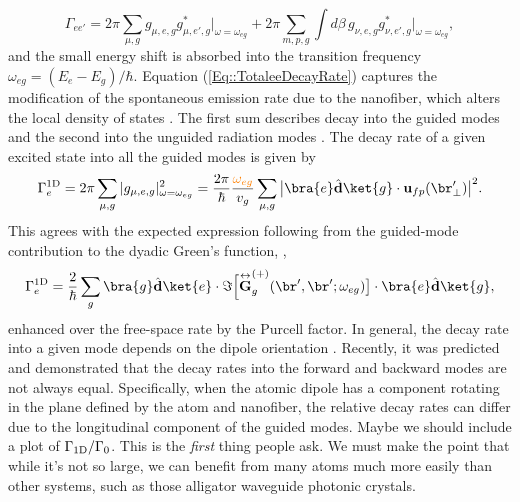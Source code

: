 \documentclass[]{report}
\newcommand{\tensor}[1]{\overset{\leftrightarrow}{#1}} %
\newcommand{\oneD}{{\rm 1D}}
\newcommand{\comment}[1]{{\color{orange} #1}}
\begin{document}
	\begin{equation}
		\Gamma_{ee'} = 2\pi \sum_{\mu,g} g_{\mu,e,g}g^*_{\mu,e',g} \vert_{\omega=\omega_{eg}}+2\pi 
\sum_{m,p,g} \int d\beta \, g_{\nu,e,g}g^*_{\nu,e',g} \vert_{\omega=\omega_{eg}}, \label{Eq::TotaleeDecayRate}
	\end{equation}
and the small energy shift is absorbed into the transition frequency $\omega_{eg} = (E_e - E_g)/\hbar$.  Equation (\ref{Eq::TotaleeDecayRate}) captures the modification of the spontaneous emission rate due to the nanofiber, which alters the local density of states \cite{LeKien2005a}.  The first sum describes decay into the guided modes and the second into the unguided radiation modes \cite{ Nha1997,Klimov2004,LeKien2005a,Maslov2006}. The decay rate of a given excited state into all the guided modes is given by
	\begin{equation}
		\Gamma_e^{\oneD}= 2\pi \sum_{\mu,g} |g_{\mu,e,g} |^2_{\omega = \omega_{eg}} =  \frac{ 2\pi }{\hbar} \frac{ \comment{\omega_{eg}} }{v_g} \sum_{\mu,g} \big|\bra{e}\hat{\mathbf{d}}\ket{g} \cdot \mathbf{u}_{fp}(\br'_\perp)\big|^2  .
	\end{equation}
This agrees with the expected expression following from the guided-mode contribution to the dyadic Green's function, ,
	\begin{equation}
		\Gamma_e^{\oneD} =  \frac{2}{\hbar} \sum_{g}  \bra{g}\hat{\mathbf{d}}\ket{e}\cdot 
\Im \Big[\tensor{\mathbf{G}}^{(+)}_g(\br', \br'; \omega_{eg} ) \big] \cdot \bra{e}\hat{\mathbf{d}}\ket{g} ,
	\end{equation}
enhanced over the free-space rate by the Purcell factor.  In general, the decay rate into a given mode depends on the dipole orientation \cite{Klimov2004, Vos2009}. Recently, it was predicted \cite{LeKien2014a} and demonstrated \cite{Mitsch2014a} that the decay rates into the forward and backward modes are not always equal.  Specifically, when the atomic dipole has a component rotating in the plane defined by the atom and nanofiber, the relative decay rates can differ due to the longitudinal component of the guided modes. \comment{Maybe we should include a plot of $\Gamma_{\rm 1D}/\Gamma_0$.  This is the \emph{first} thing people ask.  We must make the point that while it's not so large, we can benefit from many atoms much more easily than other systems, such as those alligator waveguide photonic crystals.}
\end{document}

